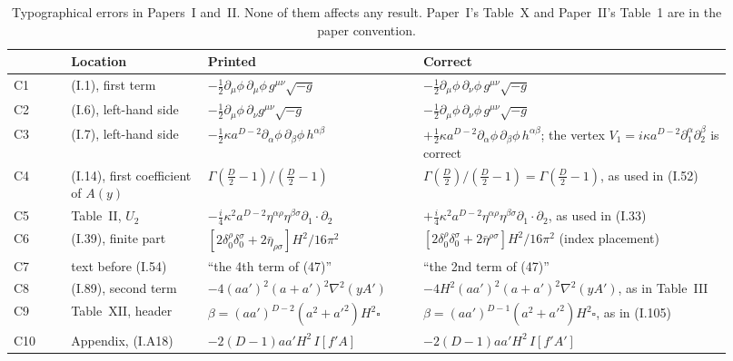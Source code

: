 \documentclass[aps,prd,onecolumn,10pt,nofootinbib,floatfix]{revtex4-2}
\newcommand{\eqI}[1]{(I.#1)}
\begin{document}
\begin{table}[tbp]
\caption{Typographical errors in Papers~I and~II\@. None of them affects any result. Paper~I's Table~X and Paper~II's Table~1 are in the
paper convention.}
\label{tab:s0s1s7s8:errata}
\renewcommand{\arraystretch}{1.25}
\footnotesize
\begin{ruledtabular}
\begin{tabular}{@{}l>{\raggedright\arraybackslash}p{0.19\linewidth}>{\raggedright\arraybackslash}p{0.30\linewidth}%
>{\raggedright\arraybackslash}p{0.43\linewidth}@{}}
& Location & Printed & Correct\\
\hline
C1 & \eqI{1}, first term & $-\tfrac12\partial_\mu\phi\,\partial_\mu\phi\,g^{\mu\nu}\sqrt{-g}$ &
$-\tfrac12\partial_\mu\phi\,\partial_\nu\phi\,g^{\mu\nu}\sqrt{-g}$\\
C2 & \eqI{6}, left-hand side & $-\tfrac12\partial_\mu\phi\,\partial_\nu g^{\mu\nu}\sqrt{-g}$ &
$-\tfrac12\partial_\mu\phi\,\partial_\nu\phi\,g^{\mu\nu}\sqrt{-g}$\\
C3 & \eqI{7}, left-hand side & $-\tfrac12\kappa a^{D-2}\partial_\alpha\phi\,\partial_\beta\phi\,h^{\alpha\beta}$ &
$+\tfrac12\kappa a^{D-2}\partial_\alpha\phi\,\partial_\beta\phi\,h^{\alpha\beta}$; the vertex $V_1=i\kappa a^{D-2}\partial_1^\alpha
\partial_2^\beta$ is correct\\
C4 & \eqI{14}, first coefficient of $A(y)$ & $\Gamma(\tfrac D2-1)/(\tfrac D2-1)$ &
$\Gamma(\tfrac D2)/(\tfrac D2-1)=\Gamma(\tfrac D2-1)$, as used in \eqI{52}\\
C5 & Table~II, $U_2$ & $-\tfrac i4\kappa^2a^{D-2}\eta^{\alpha\rho}\eta^{\beta\sigma}\partial_1\!\cdot\partial_2$ &
$+\tfrac i4\kappa^2a^{D-2}\eta^{\alpha\rho}\eta^{\beta\sigma}\partial_1\!\cdot\partial_2$, as used in \eqI{33}\\
C6 & \eqI{39}, finite part & $[2\delta^\rho_0\delta^\sigma_0+2\bar\eta_{\rho\sigma}]H^2/16\pi^2$ &
$[2\delta^\rho_0\delta^\sigma_0+2\bar\eta^{\rho\sigma}]H^2/16\pi^2$ (index placement)\\
C7 & text before \eqI{54} & ``the 4th term of (47)'' & ``the 2nd term of (47)''\\
C8 & \eqI{89}, second term & $-4(aa')^2(a+a')^2\nabla^2(yA')$ & $-4H^2(aa')^2(a+a')^2\nabla^2(yA')$, as in Table~III\\
C9 & Table~XII, header & $\beta=(aa')^{D-2}(a^2+a'^2)H^2\square$ & $\beta=(aa')^{D-1}(a^2+a'^2)H^2\square$, as in \eqI{105}\\
C10 & Appendix, \eqI{A18} & $-2(D-1)aa'H^2\,I[f'A]$ & $-2(D-1)aa'H^2\,I[f'A']$\\

\end{tabular}
\end{ruledtabular}
\end{table}
\end{document}
